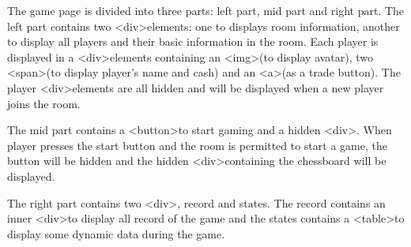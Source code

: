 \documentclass[a4paper,12pt]{article}
\begin{document}
The game page is divided into three parts: left part, mid part and right part. The left part contains two \textless div\textgreater elements: one to displays room information, another to display all players and their basic information in the room. Each player is displayed in a \textless div\textgreater elements containing an \textless img\textgreater (to display avatar), two \textless span\textgreater (to display player’s name and cash) and an \textless a\textgreater (as a trade button). The player \textless div\textgreater elements are all hidden and will be displayed when a new player joins the room. 

The mid part contains a \textless button\textgreater to start gaming and a hidden \textless div\textgreater. When player presses the start button and the room is permitted to start a game, the button will be hidden and the hidden \textless div\textgreater containing the chessboard will be displayed. 

The right part contains two \textless div\textgreater, record and states. The record contains an inner \textless div\textgreater to display all record of the game and the states contains a \textless table\textgreater to display some dynamic data during the game.
\end{document}
